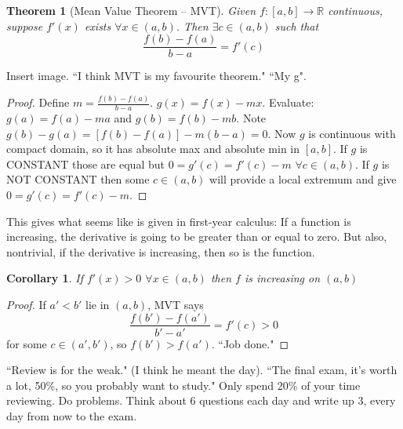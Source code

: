 \documentclass{article}
\theoremstyle{plain}
\newtheorem{theorem}{Theorem}
\newtheorem{corollary}{Corollary}
\theoremstyle{remark}
\newcommand{\R}{{\mathbb R}}
\begin{document}
\begin{theorem}[Mean Value Theorem -- MVT]
	Given $f \colon [a,b] \to \R$ continuous,
	suppose $f'(x)$ exists $\forall x \in (a,b)$.
	Then $\exists c \in (a,b)$ such that
	\[
		\frac{f(b) - f(a)}{b-a} = f'(c)
	\]
\end{theorem}
Insert image.
``I think MVT is my favourite theorem."
``My g".
\begin{proof}
	Define $m = \frac{f(b) - f(a)}{b-a}$.
	$g(x) = f(x) - mx$.
	Evaluate: $g(a) = f(a) - ma$ and $g(b) = f(b) - mb$.
	Note $g(b) - g(a) = [f(b) - f(a)] - m(b-a) = 0$.
	Now $g$ is continuous with compact domain,
	so it has absolute max and absolute min in $[a,b]$.
	If $g$ is CONSTANT those are equal but $0 = g'(c) = f'(c) - m$ $\forall c \in (a,b)$.
	If $g$ is NOT CONSTANT then some $c \in (a,b)$
	will provide a local extremum and give $0 = g'(c) = f'(c) - m$.
\end{proof}
This gives what seems like is given in first-year calculus:
If a function is increasing, the derivative is going to be greater than or equal to zero.
But also, nontrivial, if the derivative is increasing, then so is the function.
\begin{corollary}
	If $f'(x) > 0$ $\forall x \in (a,b)$ then $f$ is increasing on $(a,b)$
\end{corollary}
\begin{proof}
	If $a' < b'$ lie in $(a,b)$, MVT says
	\[
		\frac{f(b') - f(a')}{b'-a'} = f'(c) > 0
	\]
	for some $c \in (a',b')$, so $f(b') > f(a')$.
	``Job done."
\end{proof}
``Review is for the weak." (I think he meant the day).
``The final exam, it's worth a lot, 50\%, so you probably want to study."
Only spend 20\% of your time reviewing. Do problems.
Think about 6 questions each day and write up 3, every day from now to the exam.
\end{document}
